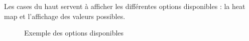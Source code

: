 \documentclass[12pt]{article}
\begin{document}
\newpage
Les cases du haut servent à afficher les différentes options disponibles  : la heat map et l'affichage des valeurs possibles. 

\begin{figure}[ht]
  \centering
  \qquad
  \caption{Exemple des options disponibles}
\end{figure}
\end{document}

